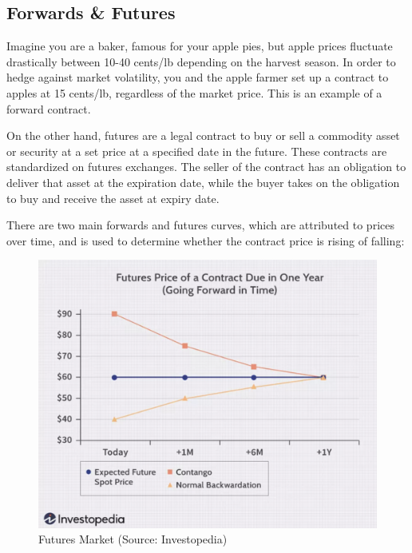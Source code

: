 \documentclass[12pt]{article}
\begin{document}
\subsection{Forwards \& Futures}
Imagine you are a baker, famous for your apple pies, but apple prices fluctuate drastically between 10-40 cents/lb depending on the harvest season. In order to hedge against market volatility, you and the apple farmer set up a contract to apples at 15 cents/lb, regardless of the market price. This is an example of a forward contract. 

On the other hand, futures are a legal contract to buy or sell a commodity asset or security at a set price at a specified date in the future. These contracts are standardized on futures exchanges. The seller of the contract has an obligation to deliver that asset at the expiration date, while the buyer takes on the obligation to buy and receive the asset at expiry date.

There are two main forwards and futures curves, which are attributed to prices over time, and is used to determine whether the contract price is rising of falling:
\begin{figure}[H]
    \centering
    \includegraphics[width=0.8\linewidth]{futures_market.png}
    \caption{Futures Market (Source: Investopedia)}
    \label{fig:futures}
\end{figure}
\end{document}
